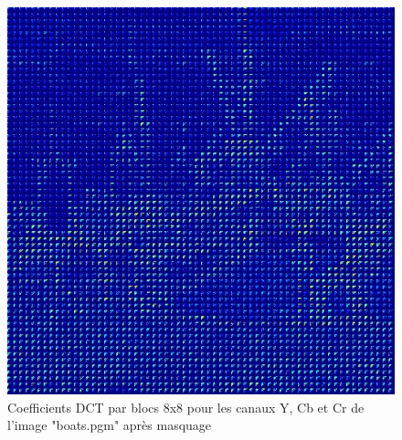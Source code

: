 \documentclass[12pt]{report}
\begin{document}
\begin{figure}[H]
\begin{center}
\includegraphics[scale=0.25]{../ImageRes/blockdct_masked_2.jpg} 
\caption{Coefficients DCT par blocs 8x8 pour les canaux Y, Cb et Cr de l'image "boats.pgm" après masquage}
\end{center}
\end{figure}
\end{document}

